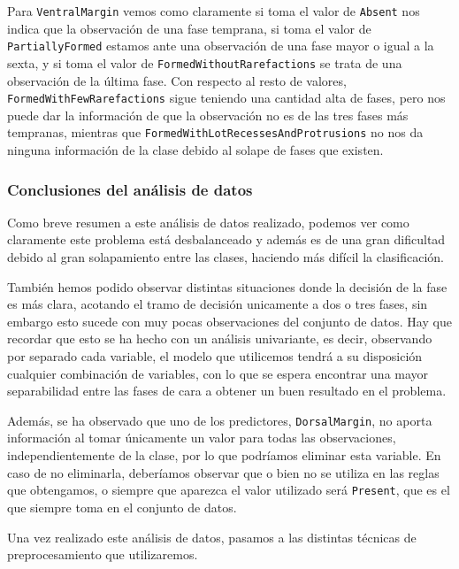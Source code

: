 Para \texttt{VentralMargin} vemos como claramente si toma el valor de \texttt{Absent} nos indica que la observación de una fase temprana, si toma el valor de \texttt{PartiallyFormed} estamos ante una observación de una fase mayor o igual a la sexta, y si toma el valor de \texttt{FormedWithoutRarefactions} se trata de una observación de la última fase. Con respecto al resto de valores, \texttt{FormedWithFewRarefactions} sigue teniendo una cantidad alta de fases, pero nos puede dar la información de que la observación no es de las tres fases más tempranas, mientras que \texttt{FormedWithLotRecessesAndProtrusions} no nos da ninguna información de la clase debido al solape de fases que existen.



\subsubsection{Conclusiones del análisis de datos}

Como breve resumen a este análisis de datos realizado, podemos ver como claramente este problema está desbalanceado y además es de una gran dificultad debido al gran solapamiento entre las clases, haciendo más difícil la clasificación.

También hemos podido observar distintas situaciones donde la decisión de la fase es más clara, acotando el tramo de decisión unicamente a dos o tres fases, sin embargo esto sucede con muy pocas observaciones del conjunto de datos. Hay que recordar que esto se ha hecho con un análisis univariante, es decir, observando por separado cada variable, el modelo que utilicemos tendrá a su disposición cualquier combinación de variables, con lo que se espera encontrar una mayor separabilidad entre las fases de cara a obtener un buen resultado en el problema.

Además, se ha observado que uno de los predictores, \texttt{DorsalMargin}, no aporta información al tomar únicamente un valor para todas las observaciones, independientemente de la clase, por lo que podríamos eliminar esta variable. En caso de no eliminarla, deberíamos observar que o bien no se utiliza en las reglas que obtengamos, o siempre que aparezca el valor utilizado será \texttt{Present}, que es el que siempre toma en el conjunto de datos.

Una vez realizado este análisis de datos, pasamos a las distintas técnicas de preprocesamiento que utilizaremos.


